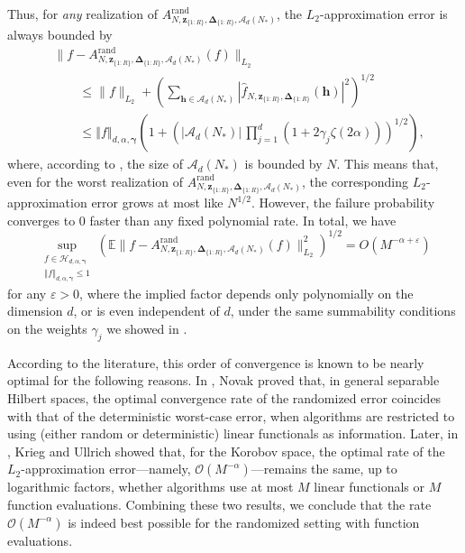 \documentclass[pdflatex,sn-basic,Numbered]{sn-jnl}%
\newcommand{\rand}{\mathrm{rand}}
\newcommand{\bsh}{\boldsymbol{h}}
\newcommand{\bsz}{\boldsymbol{z}}
\newcommand{\bsgamma}{\boldsymbol{\gamma}}
\newcommand{\bsDelta}{\boldsymbol{\Delta}}
\newcommand{\Acal}{\mathcal{A}}
\newcommand{\Hcal}{\mathcal{H}}
\newcommand{\e}{\mathbb{E}}
\newcommand{\norm}[1]{\left\Vert#1\right\Vert}
\theoremstyle{thmstyleone}%
\theoremstyle{thmstyletwo}%
\begin{document}
Thus, for \emph{any} realization of $A^{\rand}_{N,\bsz_{\{1{:}R\}},\bsDelta_{\{1{:}R\}},\Acal_d(N_*)}$, the $L_2$-approximation error is always bounded by
    \begin{align*}
        & \|f-A^{\rand}_{N,\bsz_{\{1{:}R\}},\bsDelta_{\{1{:}R\}},\Acal_d(N_*)}(f)\|_{L_2} \\
        &\qquad \leq \|f\|_{L_2}+\left(\sum_{\bsh\in \Acal_d(N_*)}\left|\widehat{f}_{N,\bsz_{\{1{:}R\}},\bsDelta_{\{1{:}R\}}}(\bsh)\right|^2\right)^{1/2}\\
        &\qquad  \leq \norm{f}_{d,\alpha,\bsgamma}\left(1+\left(|\Acal_d(N_*)|\,  \prod_{j=1}^{d}\left( 1+2\gamma_j\zeta(2\alpha)\right)\right)^{1/2}\right),
    \end{align*}
where, according to , the size of $\Acal_d(N_*)$ is bounded by $N$.
This means that, even for the worst realization of $A^{\rand}_{N,\bsz_{\{1{:}R\}},\bsDelta_{\{1{:}R\}},\Acal_d(N_*)}$, the corresponding $L_2$-approximation error grows at most like $N^{1/2}$. 
However, the failure probability converges to $0$ faster than any fixed polynomial rate. In total, we have
    \begin{equation*}
        \sup_{\substack{f\in \Hcal_{d,\alpha,\bsgamma}\\ 
  \norm{f}_{d,\alpha,\bsgamma}\le 1}}
  \left(\e\|f-A^{\rand}_{N,\bsz_{\{1{:}R\}},\bsDelta_{\{1{:}R\}},\Acal_d(N_*)}(f)\|^2_{L_2}\right)^{1/2}=O(M^{-\alpha+\varepsilon}) 
    \end{equation*}
    for any $\varepsilon>0$, where the implied factor depends only polynomially on the dimension $d$, or is even independent of $d$, under the same summability conditions on the weights $\gamma_j$ we showed in .

According to the literature, this order of convergence is known to be nearly optimal for the following reasons.
In \cite{novak1992opitmal}, Novak proved that, in general separable Hilbert spaces, the optimal convergence rate of the randomized error coincides with that of the deterministic worst-case error, when algorithms are restricted to using (either random or deterministic) linear functionals as information.
Later, in \cite{krieg2021function}, Krieg and Ullrich showed that, for the Korobov space, the optimal rate of the $L_2$-approximation error---namely, $\mathcal{O}(M^{-\alpha})$---remains the same, up to logarithmic factors, whether algorithms use at most $M$ linear functionals or $M$ function evaluations.
Combining these two results, we conclude that the rate $\mathcal{O}(M^{-\alpha})$ is indeed best possible for the randomized setting with function evaluations.
\end{document}
